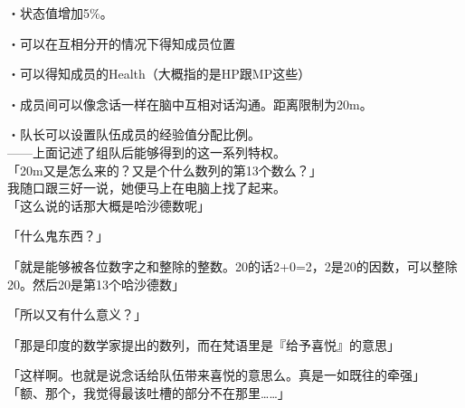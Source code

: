 ・状态值增加5\%。

・可以在互相分开的情况下得知成员位置

・可以得知成员的Health（大概指的是HP跟MP这些）

・成员间可以像念话一样在脑中互相对话沟通。距离限制为20m。

・队长可以设置队伍成员的经验值分配比例。\\

——上面记述了组队后能够得到的这一系列特权。\\

「20m又是怎么来的？又是个什么数列的第13个数么？」\\

我随口跟三好一说，她便马上在电脑上找了起来。\\

「这么说的话那大概是哈沙德数呢」

「什么鬼东西？」

「就是能够被各位数字之和整除的整数。20的话2+0=2，2是20的因数，可以整除20。然后20是第13个哈沙德数」

「所以又有什么意义？」

「那是印度的数学家提出的数列，而在梵语里是『给予喜悦』的意思」

「这样啊。也就是说念话给队伍带来喜悦的意思么。真是一如既往的牵强」\\

「额、那个，我觉得最该吐槽的部分不在那里……」\\

